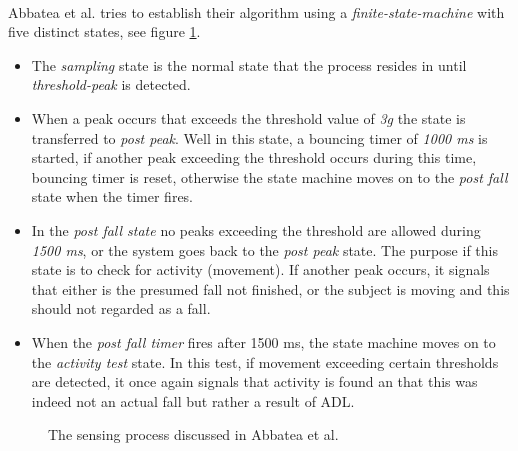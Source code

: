 \documentclass[12pt, a4paper, onecolumn]{article}
\begin{document}
	\paragraph{} Abbatea et al. tries to establish their algorithm using a \textit{finite-state-machine} with five distinct states, see figure \ref{fig:abbatea-state-machine}.
	
	\begin{itemize}
		\item The \textit{sampling} state is the normal state that the process resides in until \textit{threshold-peak} is detected.
		
		\item When a peak occurs that exceeds the threshold value of \textit{3g} the state is transferred to \textit{post peak}. Well in this state, a bouncing timer of \textit{1000 ms} is started, if another peak exceeding the threshold occurs during this time, bouncing timer is reset, otherwise the state machine moves on to the \textit{post fall} state when the timer fires.
		
		\item In the \textit{post fall state} no peaks exceeding the threshold are allowed during \textit{1500 ms}, or the system goes back to the \textit{post peak} state. The purpose if this state is to check for activity (movement). If another peak occurs, it signals that either is the presumed fall not finished, or the subject is moving and this should not regarded as a fall. 
		
		\item When the \textit{post fall timer} fires after 1500 ms, the state machine moves on to the \textit{activity test} state. In this test, if movement exceeding certain thresholds are detected, it once again signals that activity is found an that this was indeed not an actual fall but rather a result of ADL. 
		
	\end{itemize}  
	
	
	\begin{figure}[H]
		\centering
		\caption{The sensing process discussed in Abbatea et al.}%
		\label{fig:abbatea-state-machine}%
	\end{figure}
	
\end{document}
